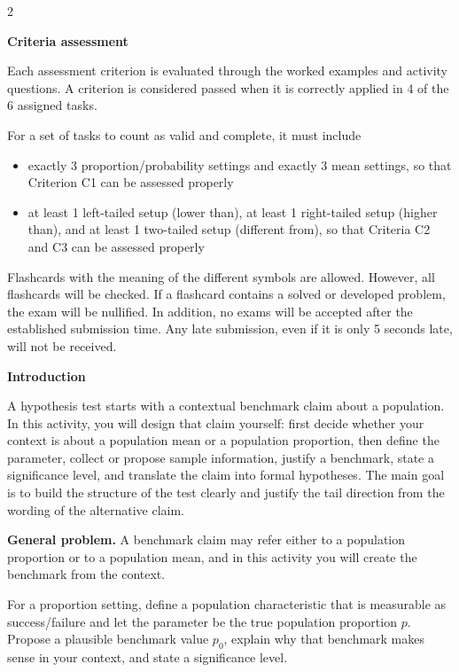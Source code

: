 \documentclass[12pt]{article}
\newcommand{\SubsectionBox}[1]{%
\noindent\colorbox{gray!30}{%
\parbox{\linewidth}{\textbf{#1}}%
}\par\vspace{0.35cm}%
}
\begin{document}
\begin{multicols}{2}
\SubsectionBox{Criteria assessment}\vspace{-0.25cm}
Each assessment criterion is evaluated through the worked examples and activity questions. A criterion is considered passed when it is correctly applied in 4 of the 6 assigned tasks.

For a set of tasks to count as valid and complete, it must include
\begin{itemize}
	\item exactly 3 proportion/probability settings and exactly 3 mean settings, so that Criterion C1 can be assessed properly
	\item at least 1 left-tailed setup (lower than), at least 1 right-tailed setup (higher than), and at least 1 two-tailed setup (different from), so that Criteria C2 and C3 can be assessed properly
\end{itemize}

Flashcards with the meaning of the different symbols are allowed. However, all flashcards will be checked. If a flashcard contains a solved or developed problem, the exam will be nullified. In addition, no exams will be accepted after the established submission time. Any late submission, even if it is only 5 seconds late, will not be received.


\vspace{0.15cm}
\SubsectionBox{Introduction}\vspace{-0.25cm}
A hypothesis test starts with a contextual benchmark claim about a population. In this activity, you will design that claim yourself: first decide whether your context is about a population mean or a population proportion, then define the parameter, collect or propose sample information, justify a benchmark, state a significance level, and translate the claim into formal hypotheses. The main goal is to build the structure of the test clearly and justify the tail direction from the wording of the alternative claim.

\vspace{0.2cm}
\textbf{General problem.}
A benchmark claim may refer either to a population proportion or to a population mean, and in this activity you will create the benchmark from the context.

For a proportion setting, define a population characteristic that is measurable as success/failure and let the parameter be the true population proportion \(p\). Propose a plausible benchmark value \(p_0\), explain why that benchmark makes sense in your context, and state a significance level.


\end{multicols}
\end{document}
